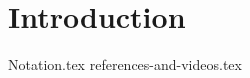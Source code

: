 \documentclass[../open-optimization/open-optimization.tex]{subfiles}
\begin{document}

\chapter*{Introduction}
{Notation.tex}
{references-and-videos.tex}

\end{document}
